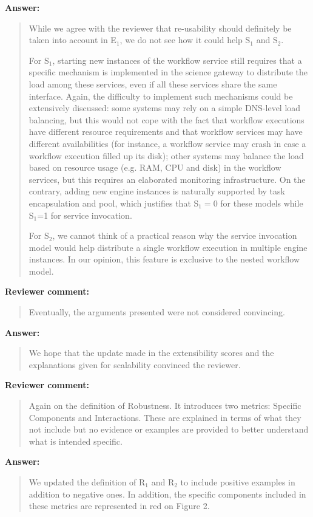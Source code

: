 \documentclass[a4]{article}
\newenvironment{review}%
{\textbf{Reviewer comment:}\begin{quote}}%
{\end{quote}}%
\newenvironment{answer}%
{\textbf{Answer:}\begin{small}\begin{quote}}%
{\end{quote}\end{small}}%
\begin{document}
\begin{answer}
  While we agree with the reviewer that re-usability should
  definitely be taken into account in E$_1$, we do not see how it
  could help S$_1$ and S$_2$.

  For S$_1$, starting new instances of the workflow service still
  requires that a specific mechanism is implemented in the science
  gateway to distribute the load among these services, even if all
  these services share the same interface. Again, the difficulty to
  implement such mechanisms could be extensively discussed: some
  systems may rely on a simple DNS-level load balancing, but this
  would not cope with the fact that workflow executions have different
  resource requirements and that workflow services may have different
  availabilities (for instance, a workflow service may crash in case a
  workflow execution filled up its disk); other systems may balance
  the load based on resource usage (e.g. RAM, CPU and disk) in the
  workflow services, but this requires an elaborated monitoring
  infrastructure. On the contrary, adding new engine instances is
  naturally supported by task encapsulation and pool, which justifies
  that S$_1=0$ for these models while S$_1$=1 for service invocation.

  For S$_2$, we cannot think of a practical reason why the service
  invocation model would help distribute a single workflow execution
  in multiple engine instances. In our opinion, this feature is
  exclusive to the nested workflow model.
\end{answer}

\begin{review}
 Eventually, the arguments presented were not considered convincing.
\end{review}

\begin{answer}
We hope that the update made in the extensibility scores and the
explanations given for scalability convinced the reviewer.
\end{answer}

\begin{review}
  Again on the definition of Robustness. It introduces two metrics:
  Specific Components and Interactions. These are explained in terms
  of what they not include but no evidence or examples are provided to
  better understand what is intended specific. 
\end{review}

\begin{answer}
  We updated the definition of R$_1$ and R$_2$ to include positive
  examples in addition to negative ones. In addition, the specific
  components included in these metrics are represented in red on
  Figure 2.
\end{answer}
\end{document}

